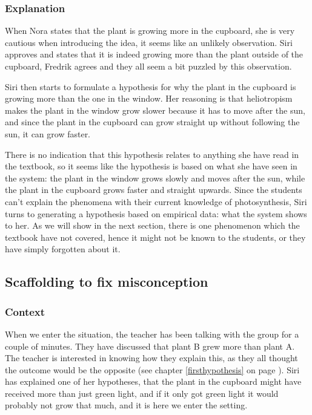\subsubsection*{Explanation}
When Nora states that the plant is growing more in the cupboard, she is very cautious when introducing the idea, it seems like an unlikely observation. Siri approves and states that it is indeed growing more than the plant outside of the cupboard, Fredrik agrees and they all seem a bit puzzled by this observation.

Siri then starts to formulate a hypothesis for why the plant in the cupboard is growing more than the one in the window. Her reasoning is that heliotropism makes the plant in the window grow slower because it has to move after the sun, and since the plant in the cupboard can grow straight up without following the sun, it can grow faster. 

There is no indication that this hypothesis relates to anything she have read in the textbook, so it seems like the hypothesis is based on what she have seen in the system: the plant in the window grows slowly and moves after the sun, while the plant in the cupboard grows faster and straight upwards. Since the students can't explain the phenomena with their current knowledge of photosynthesis, Siri turns to generating a hypothesis based on empirical data: what the system shows to her. As we will show in the next section, there is one phenomenon which the textbook have not covered, hence it might not be known to the students, or they have simply forgotten about it.


\subsection{Scaffolding to fix misconception}

\subsubsection*{Context}
When we enter the situation, the teacher has been talking with the group for a couple of minutes. They have discussed that plant B grew more than plant A. The teacher is interested in knowing how they explain this, as they all thought the outcome would be the opposite (see chapter \ref{firsthypothesis} on page \pageref{firsthypothesis}). Siri has explained one of her hypotheses, that the plant in the cupboard might have received more than just green light, and if it only got green light it would probably not grow that much, and it is here we enter the setting.
 
